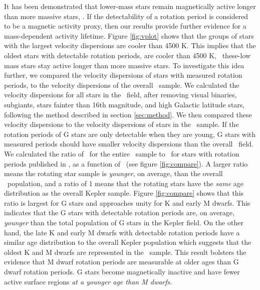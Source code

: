 It has been demonstrated that lower-mass stars remain magnetically active
longer than more massive stars, \citep[\eg][]{west2008, kiman2019}.
If the detectability of a rotation period is considered to be a magnetic
activity proxy, then our results provide further evidence for a mass-dependent
activity lifetime.
Figure \ref{fig:vplot} shows that the groups of stars with the largest
velocity dispersions are cooler than 4500 K.
This implies that the oldest stars with detectable rotation periods, are
cooler than 4500 K, \ie\ these-low mass stars stay active longer than more
massive stars.
To investigate this idea further, we compared the velocity dispersions of
stars with measured rotation periods, to the velocity dispersions of the
overall \kepler\ sample.
We calculated the velocity dispersions for all stars in the \kepler\ field,
after removing visual binaries, subgiants, stars fainter than 16th magnitude,
and high Galactic latitude stars, following the method described in section
\ref{sec:method}.
We then compared these velocity dispersions to the velocity dispersions of
stars in the \mct\ sample.
If the rotation periods of G stars are only detectable when they are young,
G stars with measured periods should have smaller velocity dispersions than
the overall \kepler\ field.
We calculated the ratio of \sigmavb\ for the entire \Kepler\ sample to
\sigmavb\ for stars with rotation periods published in \mct, as a function of
\teff\ (see figure \ref{fig:compare}).
A larger ratio means the rotating star sample is {\it younger}, on average,
than the overall \Kepler\ population, and a ratio of 1 means that the rotating
stars have the {\it same} age distribution as the overall Kepler sample.
Figure \ref{fig:compare} shows that this ratio is largest for G stars and
approaches unity for K and early M dwarfs.
This indicates that the G stars with detectable rotation periods are, on
average, {\it younger} than the total population of G stars in the Kepler
field.
On the other hand, the late K and early M dwarfs with detectable rotation
periods have a similar age distribution to the overall Kepler population which
suggests that the oldest K and M dwarfs are represented in the \mct\ sample.
This result bolsters the evidence that M dwarf rotation periods are measurable
at older ages than G dwarf rotation periods.
G stars become magnetically inactive and have fewer active surface regions
{\it at a younger age than M dwarfs}.

